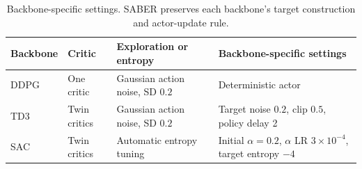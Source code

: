 \begin{table}[t]
\centering
\small
\setlength{\tabcolsep}{6pt}
\begin{tabular}{llll}
\toprule
Backbone & Critic & Exploration or entropy & Backbone-specific settings \\
\midrule
DDPG & One critic & Gaussian action noise, SD \(0.2\) & Deterministic actor \\
TD3 & Twin critics & Gaussian action noise, SD \(0.2\) & Target noise \(0.2\), clip \(0.5\), policy delay 2 \\
SAC & Twin critics & Automatic entropy tuning & Initial \(\alpha=0.2\), \(\alpha\) LR \(3\times10^{-4}\), target entropy \(-4\) \\
\bottomrule
\end{tabular}
\caption{Backbone-specific settings. SABER preserves each backbone's target
construction and actor-update rule.}
\label{tab:supp-backbone-settings}
\end{table}

